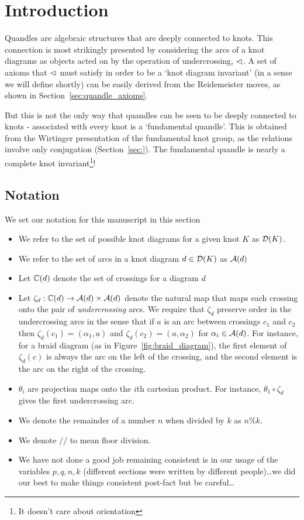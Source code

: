 \documentclass[paper.tex]{subfiles}
\begin{document}
\section{Introduction}
\label{sec:intro}

Quandles are algebraic structures that are deeply connected to knots. This connection is most strikingly presented by considering the arcs of a knot diagrams as objects acted on by the operation of
undercrossing, $\vartriangleleft$. A set of axioms that $\vartriangleleft$ must satisfy in order to be a `knot diagram invariant' (in a sense we will define shortly) can be easily derived from the Reidemeister moves, as shown in
Section~\ref{sec:quandle_axioms}.

But this is not the only way that quandles can be seen to be deeply connected to knots - associated with every knot is a `fundamental quandle'. This is obtained from the Wirtinger presentation of the fundamental knot group,
as the relations involve only conjugation (Section~\ref{sec:}). The fundamental quandle is nearly a complete knot invariant\footnote{It doesn't care about orientation}!


\subsection{Notation}

We set our notation for this manuscript in this section

\begin{itemize}
  \item We refer to the set of possible knot diagrams for a given knot $K$ as $\operatorname{\mathcal{D}}(K)$.
  \item We refer to the set of arcs in a knot diagram $d \in \operatorname{\mathcal{D}}(K)$ as $\mathcal{A}(d)$
  \item Let $\mathbb{C}(d)$ denote the set of crossings for a diagram $d$
  \item Let $\zeta_d: \mathbb{C}(d) \to \mathcal{A}(d) \times \mathcal{A}(d)$ denote the natural map that maps each crossing onto the pair of
    \emph{undercrossing} arcs. We require that $\zeta_d$ preserve order in the undercrossing arcs in the
    sense that if $a$ is an arc between crossings $c_1$ and $c_2$ then $\zeta_d(c_1) = (\alpha_1, a)$ and $\zeta_d(c_2) = (a, \alpha_2)$ for
    $\alpha_i \in \mathcal{A}(d)$. For instance, for a braid diagram (as in Figure~\ref{fig:braid_diagram}), the first element of $\zeta_d(c)$ is always the arc on the left of the crossing,
    and the second element is the arc on the right of the crossing.
  \item $\theta_i$ are projection maps onto the $i$th cartesian product. For instance, $\theta_1 \circ \zeta_d$ gives the first undercrossing arc.
  \item We denote the remainder of a number $n$ when divided by $k$ as $n\%k$.
  \item We denote $//$ to mean floor division.
  \item We have not done a good job remaining consistent is in our usage of the variables $p,q,n,k$ (different sections were written by different people)\dots we did our best to make things consistent
    post-fact but be careful\dots
\end{itemize}
\end{document}
